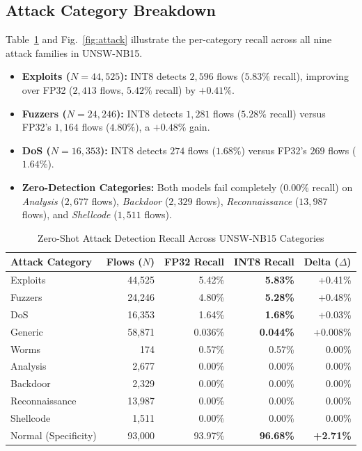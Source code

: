 \subsection{Attack Category Breakdown}
Table~\ref{tab:per_attack} and Fig.~\ref{fig:attack} illustrate the per-category recall across all nine attack families in UNSW-NB15.
\begin{itemize}
    \item \textbf{Exploits ($N = 44,525$):} INT8 detects $2,596$ flows ($5.83\%$ recall), improving over FP32 ($2,413$ flows, $5.42\%$ recall) by $+0.41\%$.
    \item \textbf{Fuzzers ($N = 24,246$):} INT8 detects $1,281$ flows ($5.28\%$ recall) versus FP32's $1,164$ flows ($4.80\%$), a $+0.48\%$ gain.
    \item \textbf{DoS ($N = 16,353$):} INT8 detects $274$ flows ($1.68\%$) versus FP32's $269$ flows ($1.64\%$).
    \item \textbf{Zero-Detection Categories:} Both models fail completely ($0.00\%$ recall) on \emph{Analysis} ($2,677$ flows), \emph{Backdoor} ($2,329$ flows), \emph{Reconnaissance} ($13,987$ flows), and \emph{Shellcode} ($1,511$ flows).
\end{itemize}

\begin{table}[h]
\centering
\caption{Zero-Shot Attack Detection Recall Across UNSW-NB15 Categories}
\label{tab:per_attack}
\renewcommand{\arraystretch}{1.1}
\begin{tabular}{lrrrr}
\hline
\textbf{Attack Category} & \textbf{Flows ($N$)} & \textbf{FP32 Recall} & \textbf{INT8 Recall} & \textbf{Delta ($\Delta$)} \\
\hline
Exploits & 44,525 & 5.42\% & \textbf{5.83\%} & +0.41\% \\
Fuzzers & 24,246 & 4.80\% & \textbf{5.28\%} & +0.48\% \\
DoS & 16,353 & 1.64\% & \textbf{1.68\%} & +0.03\% \\
Generic & 58,871 & 0.036\% & \textbf{0.044\%} & +0.008\% \\
Worms & 174 & 0.57\% & 0.57\% & 0.00\% \\
Analysis & 2,677 & 0.00\% & 0.00\% & 0.00\% \\
Backdoor & 2,329 & 0.00\% & 0.00\% & 0.00\% \\
Reconnaissance & 13,987 & 0.00\% & 0.00\% & 0.00\% \\
Shellcode & 1,511 & 0.00\% & 0.00\% & 0.00\% \\
\hline
Normal (Specificity) & 93,000 & 93.97\% & \textbf{96.68\%} & \textbf{+2.71\%} \\
\hline
\end{tabular}
\end{table}

